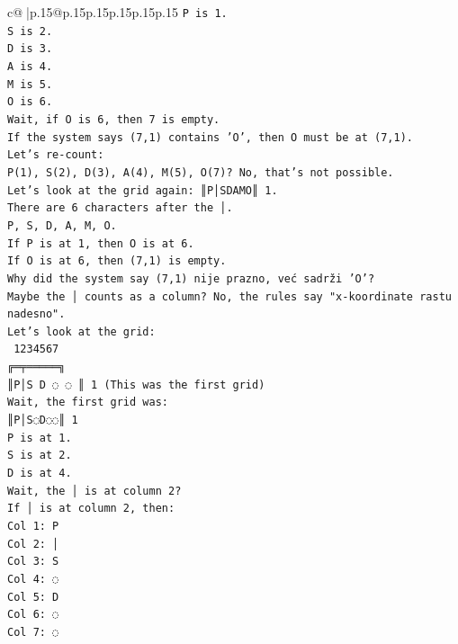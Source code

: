 \documentclass{article}
\begin{document}
{\begin{supertabular}{c@{$\;$}|p{.15\linewidth}@{}p{.15\linewidth}p{.15\linewidth}p{.15\linewidth}p{.15\linewidth}p{.15\linewidth}}
{{{\texttt{P is 1.} \\
\texttt{S is 2.} \\
\texttt{D is 3.} \\
\texttt{A is 4.} \\
\texttt{M is 5.} \\
\texttt{O is 6.} \\
\texttt{Wait, if O is 6, then 7 is empty.} \\
\texttt{If the system says (7,1) contains 'O', then O must be at (7,1).} \\
\texttt{Let's re{-}count:} \\
\texttt{P(1), S(2), D(3), A(4), M(5), O(7)? No, that's not possible.} \\
\texttt{Let's look at the grid again: ║P│SDAMO║ 1.} \\
\texttt{There are 6 characters after the │.} \\
\texttt{P, S, D, A, M, O.} \\
\texttt{If P is at 1, then O is at 6.} \\
\texttt{If O is at 6, then (7,1) is empty.} \\
\texttt{Why did the system say (7,1) nije prazno, već sadrži 'O'?} \\
\texttt{Maybe the │ counts as a column? No, the rules say "x{-}koordinate rastu nadesno".} \\
\texttt{Let's look at the grid:} \\
\texttt{ 1234567} \\
\texttt{╔═╤═════╗} \\
\texttt{║P│S D ◌ ◌ ║ 1 (This was the first grid)} \\
\texttt{Wait, the first grid was:} \\
\texttt{║P│S◌D◌◌║ 1} \\
\texttt{P is at 1.} \\
\texttt{S is at 2.} \\
\texttt{D is at 4.} \\
\texttt{Wait, the │ is at column 2?} \\
\texttt{If │ is at column 2, then:} \\
\texttt{Col 1: P} \\
\texttt{Col 2: │} \\
\texttt{Col 3: S} \\
\texttt{Col 4: ◌} \\
\texttt{Col 5: D} \\
\texttt{Col 6: ◌} \\
\texttt{Col 7: ◌} \\
}}}
\end{supertabular}}
\end{document}
